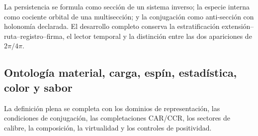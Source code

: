 La persistencia se formula como sección de un sistema inverso; la especie
interna como cociente orbital de una multisección; y la conjugación como
anti-sección con holonomía declarada. El desarrollo completo conserva la
estratificación extensión--ruta--registro--firma, el lector temporal y la
distinción entre las dos apariciones de \(2\pi/4\pi\).

\begingroup
\let\chapter\section
\let\section\subsection
\let\subsection\subsubsection
\let\subsubsection\paragraph
\let\clearpage\relax
\let\cleardoublepage\relax

\endgroup

\section{Ontología material, carga, espín, estadística, color y sabor}
La definición plena se completa con los dominios de representación, las
condiciones de conjugación, las completaciones CAR/CCR, los sectores de
calibre, la composición, la virtualidad y los controles de positividad.

